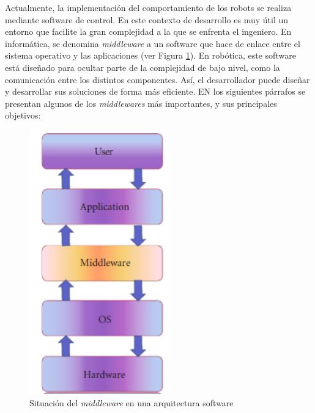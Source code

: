 \documentclass[12pt,spanish,chapterprefix, numbers=noenddot]{book}
\numberwithin{equation}{section}
\numberwithin{figure}{section}
\begin{document}
Actualmente, la implementación del comportamiento de los robots se realiza mediante software de control. En este contexto de desarrollo es muy útil un entorno que facilite la gran complejidad a la que se enfrenta el ingeniero. En informática, se denomina \textit{middleware} a un software que hace de enlace entre el sistema operativo y las aplicaciones (ver Figura \ref{fig:middleware}). En robótica, este software está diseñado para ocultar parte de la complejidad de bajo nivel, como la comunicación entre los distintos componentes. Así, el desarrollador puede diseñar y desarrollar sus soluciones de forma más eficiente. EN los siguientes párrafos se presentan algunos de los \textit{middlewares} más importantes, y sus principales objetivos: 
\begin{figure}[hbt!]
\centering
\includegraphics[width=6cm]{Figs/layersMiddleware.png}
\par
\caption{\label{fig:middleware}Situación del \textit{middleware} en una arquitectura software}
\end{figure}
\end{document}
